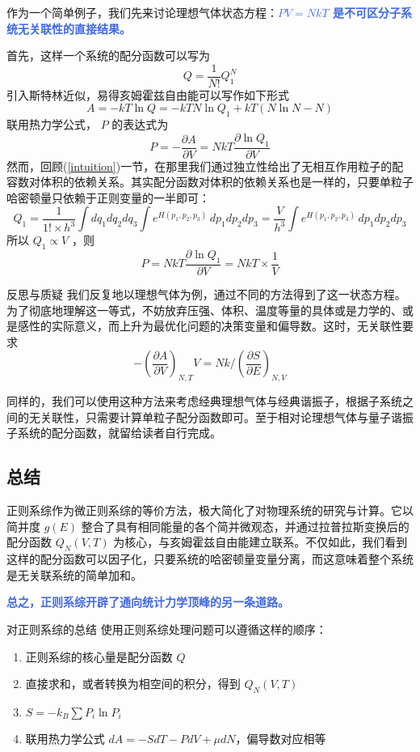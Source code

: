 \documentclass[hyperref,UTF-8]{ctexart}
\newcommand{\0}{\boldsymbol{0}}
\begin{document}
作为一个简单例子，我们先来讨论理想气体状态方程：\textcolor{RoyalBlue}{\textbf{\kaishu $PV = NkT$ 是不可区分子系统无关联性的直接结果。}}

首先，这样一个系统的配分函数可以写为
\[
    Q = \frac{1}{N!} Q_1^N
\]
引入斯特林近似，易得亥姆霍兹自由能可以写作如下形式
\[
    A = -kT\ln Q = -kT N \ln Q_1 + kT(N\ln N - N)
\]
联用热力学公式， $P$ 的表达式为
\[
    P = - \frac{\partial A}{\partial V} = NkT \frac{\partial \ln Q_1}{\partial V}
\]
然而，回顾(\ref*{intuition})一节，在那里我们通过独立性给出了无相互作用粒子的配容数对体积的依赖关系。其实配分函数对体积的依赖关系也是一样的，只要单粒子哈密顿量只依赖于正则变量的一半即可：
\[
    Q_1 = \frac{1}{1!\times h^3}\int dq_1dq_2dq_3\int e^{H(p_1,p_2,p_3)}\,dp_1dp_2dp_3  = \frac{V}{h^3} \int e^{H(p_1,p_2,p_3)}\,dp_1dp_2dp_3
\]
所以 $Q_1 \propto V$ ，则
\[
    P = NkT \frac{\partial \ln Q_1}{\partial V} = NkT \times \frac{1}{V} 
\]
\begin{justification}{\kaishu 反思与质疑}
\kaishu \fontsize{11pt}{16pt}
    \quad\quad 我们反复地以理想气体为例，通过不同的方法得到了这一状态方程。为了彻底地理解这一等式，不妨放弃压强、体积、温度等量的具体或是力学的、或是感性的实际意义，而上升为最优化问题的决策变量和偏导数。这时，无关联性要求
    \[
        -\left(\frac{\partial A}{\partial V}\right)_{N,T} V = Nk \bigg/ \left(\frac{\partial S}{\partial E} \right)_{N,V}
    \]
\end{justification}

同样的，我们可以使用这种方法来考虑经典理想气体与经典谐振子，根据子系统之间的无关联性，只需要计算单粒子配分函数即可。至于相对论理想气体与量子谐振子系统的配分函数，就留给读者自行完成。

\subsection{总结}

正则系综作为微正则系综的等价方法，极大简化了对物理系统的研究与计算。它以简并度 $g(E)$ 整合了具有相同能量的各个简并微观态，并通过拉普拉斯变换后的配分函数 $Q_N(V,T)$ 为核心，与亥姆霍兹自由能建立联系。不仅如此，我们看到这样的配分函数可以因子化，只要系统的哈密顿量变量分离，而这意味着整个系统是无关联系统的简单加和。

\textcolor{RoyalBlue}{\textbf{\kaishu 总之，正则系综开辟了通向统计力学顶峰的另一条道路。}}

\begin{understanding}{\kaishu 对正则系综的总结}
\kaishu \fontsize{11pt}{16pt}
使用正则系综处理问题可以遵循这样的顺序：
\begin{enumerate}
    \item 正则系综的核心量是配分函数 $Q$
    \item 直接求和，或者转换为相空间的积分，得到 $Q_N(V,T)$
    \item $S = -k_B \sum P_i \ln P_i$
    \item 联用热力学公式 $dA = -SdT - PdV + \mu dN$，偏导数对应相等
\end{enumerate}

\end{understanding}
\end{document}
